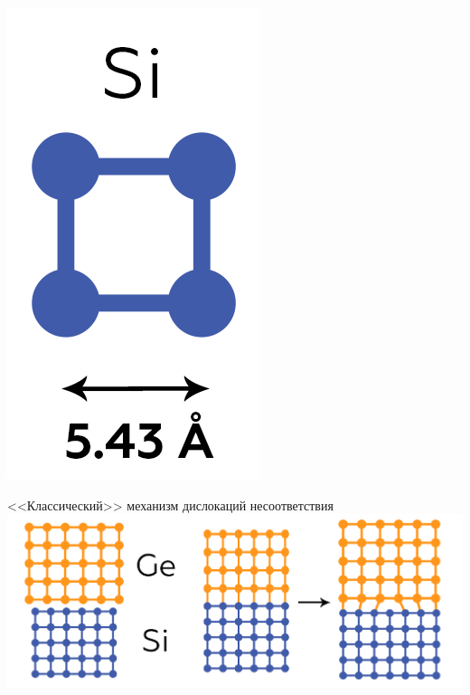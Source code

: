 \documentclass[10pt,pdf,hyperref={unicode}, dvipsnames]{beamer}
\begin{document}
\begin{frame}[t]
\begin{minipage}{0.15\linewidth}
		\includegraphics[width=\linewidth]{imgs/Sicell.png}
		\vfill
	\end{minipage}
	\begin{minipage}{0.84\linewidth}
	\centering
		
		<<Классический>> механизм дислокаций несоответствия
		\includegraphics[width = \linewidth]{imgs/1st.png}
		

\end{minipage}
\end{frame}
\end{document}
